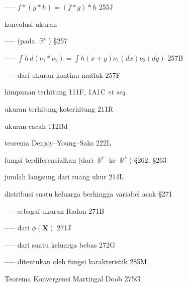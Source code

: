 ----- $f*(g*h)=(f*g)*h$ 255J


konvolusi ukuran

----- (pada $\BbbR^r$) \S257



----- $\int h\,d(\nu_1*\nu_2)=\int h(x+y)\nu_1(dx)\nu_2(dy)$
257B


----- dari ukuran kontinu mutlak 257F






himpunan terhitung 111F, 1A1C {\it et seq.}

ukuran terhitung-koterhitung 211R








 ukuran cacah 112Bd










\indexmedskip







 teorema Denjoy--Young--Saks 222L




 fungsi terdiferensialkan (dari $\BbbR^r$ ke $\BbbR^s$) \S262, \S263


 jumlah langsung dari ruang ukur 214L










 distribusi suatu keluarga berhingga variabel acak \S271

----- sebagai ukuran Radon 271B

----- dari $\phi(\pmb{X})$ 271J

----- dari suatu keluarga bebas 272G

----- ditentukan oleh fungsi karakteristik 285M
















 Teorema Konvergensi Martingal Doob 275G



















